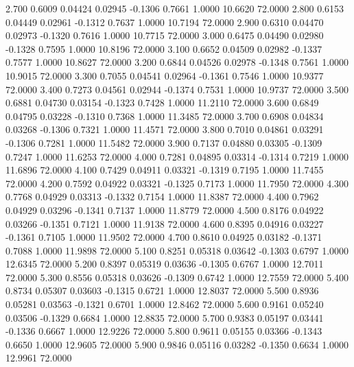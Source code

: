    2.700   0.6009   0.04424   0.02945  -0.1306   0.7661   1.0000  10.6620  72.0000
   2.800   0.6153   0.04449   0.02961  -0.1312   0.7637   1.0000  10.7194  72.0000
   2.900   0.6310   0.04470   0.02973  -0.1320   0.7616   1.0000  10.7715  72.0000
   3.000   0.6475   0.04490   0.02980  -0.1328   0.7595   1.0000  10.8196  72.0000
   3.100   0.6652   0.04509   0.02982  -0.1337   0.7577   1.0000  10.8627  72.0000
   3.200   0.6844   0.04526   0.02978  -0.1348   0.7561   1.0000  10.9015  72.0000
   3.300   0.7055   0.04541   0.02964  -0.1361   0.7546   1.0000  10.9377  72.0000
   3.400   0.7273   0.04561   0.02944  -0.1374   0.7531   1.0000  10.9737  72.0000
   3.500   0.6881   0.04730   0.03154  -0.1323   0.7428   1.0000  11.2110  72.0000
   3.600   0.6849   0.04795   0.03228  -0.1310   0.7368   1.0000  11.3485  72.0000
   3.700   0.6908   0.04834   0.03268  -0.1306   0.7321   1.0000  11.4571  72.0000
   3.800   0.7010   0.04861   0.03291  -0.1306   0.7281   1.0000  11.5482  72.0000
   3.900   0.7137   0.04880   0.03305  -0.1309   0.7247   1.0000  11.6253  72.0000
   4.000   0.7281   0.04895   0.03314  -0.1314   0.7219   1.0000  11.6896  72.0000
   4.100   0.7429   0.04911   0.03321  -0.1319   0.7195   1.0000  11.7455  72.0000
   4.200   0.7592   0.04922   0.03321  -0.1325   0.7173   1.0000  11.7950  72.0000
   4.300   0.7768   0.04929   0.03313  -0.1332   0.7154   1.0000  11.8387  72.0000
   4.400   0.7962   0.04929   0.03296  -0.1341   0.7137   1.0000  11.8779  72.0000
   4.500   0.8176   0.04922   0.03266  -0.1351   0.7121   1.0000  11.9138  72.0000
   4.600   0.8395   0.04916   0.03227  -0.1361   0.7105   1.0000  11.9502  72.0000
   4.700   0.8610   0.04925   0.03182  -0.1371   0.7088   1.0000  11.9898  72.0000
   5.100   0.8251   0.05318   0.03642  -0.1303   0.6797   1.0000  12.6345  72.0000
   5.200   0.8397   0.05319   0.03636  -0.1305   0.6767   1.0000  12.7011  72.0000
   5.300   0.8556   0.05318   0.03626  -0.1309   0.6742   1.0000  12.7559  72.0000
   5.400   0.8734   0.05307   0.03603  -0.1315   0.6721   1.0000  12.8037  72.0000
   5.500   0.8936   0.05281   0.03563  -0.1321   0.6701   1.0000  12.8462  72.0000
   5.600   0.9161   0.05240   0.03506  -0.1329   0.6684   1.0000  12.8835  72.0000
   5.700   0.9383   0.05197   0.03441  -0.1336   0.6667   1.0000  12.9226  72.0000
   5.800   0.9611   0.05155   0.03366  -0.1343   0.6650   1.0000  12.9605  72.0000
   5.900   0.9846   0.05116   0.03282  -0.1350   0.6634   1.0000  12.9961  72.0000

